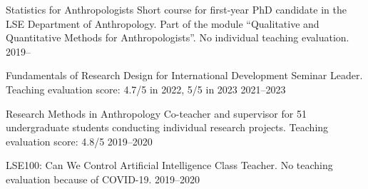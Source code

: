 



\begin{cvexperiences}

\nopagebreak
  \cvexperience
    {Statistics for Anthropologists} %
    {Short course for first-year PhD candidate in the LSE Department of Anthropology. Part of the module ``Qualitative and Quantitative Methods for Anthropologists''. No individual teaching evaluation.} %
    {2019--} %

\end{cvexperiences}


\begin{cvexperiences}
  \cvexperience
    {Fundamentals of Research Design for International Development} %
    {Seminar Leader. Teaching evaluation score: 4.7/5 in 2022, 5/5 in 2023} %
    {2021--2023} %

  \cvexperience
    {Research Methods in Anthropology} %
    {Co-teacher and supervisor for 51 undergraduate students conducting individual research projects. Teaching evaluation score: 4.8/5} %
    {2019--2020} %

  \cvexperience
    {LSE100: Can We Control Artificial Intelligence} %
    {Class Teacher. No teaching evaluation because of COVID-19.} %
    {2019--2020} %

\end{cvexperiences}

